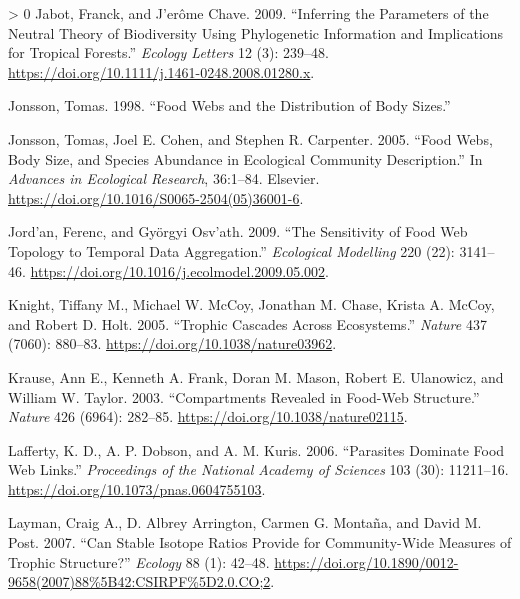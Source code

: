 \documentclass{article}
\newlength{\cslhangindent}
\newenvironment{CSLReferences}[3] %
 {%
  \setlength{\parindent}{0pt}
  \ifodd #1 \everypar{\setlength{\hangindent}{\cslhangindent}}\ignorespaces\fi
  \ifnum #2 > 0
  \setlength{\parskip}{#2\baselineskip}
  \fi
 }%
 {}
\begin{document}
\begin{CSLReferences}{1}{0}
\leavevmode\hypertarget{ref-jabotInferringParametersNeutral2009}{}%
Jabot, Franck, and J'erôme Chave. 2009. {``Inferring the Parameters of
the Neutral Theory of Biodiversity Using Phylogenetic Information and
Implications for Tropical Forests.''} \emph{Ecology Letters} 12 (3):
239--48. \url{https://doi.org/10.1111/j.1461-0248.2008.01280.x}.

\leavevmode\hypertarget{ref-JonssonPhD}{}%
Jonsson, Tomas. 1998. {``Food Webs and the Distribution of Body
Sizes.''}

\leavevmode\hypertarget{ref-jonssonFoodWebsBody2005}{}%
Jonsson, Tomas, Joel E. Cohen, and Stephen R. Carpenter. 2005. {``Food
{Webs}, {Body Size}, and {Species Abundance} in {Ecological Community
Description}.''} In \emph{Advances in {Ecological Research}}, 36:1--84.
{Elsevier}. \url{https://doi.org/10.1016/S0065-2504(05)36001-6}.

\leavevmode\hypertarget{ref-jordanSensitivityFoodWeb2009}{}%
Jord'an, Ferenc, and Györgyi Osv'ath. 2009. {``The Sensitivity of Food
Web Topology to Temporal Data Aggregation.''} \emph{Ecological
Modelling} 220 (22): 3141--46.
\url{https://doi.org/10.1016/j.ecolmodel.2009.05.002}.

\leavevmode\hypertarget{ref-knightTrophicCascadesEcosystems2005}{}%
Knight, Tiffany M., Michael W. McCoy, Jonathan M. Chase, Krista A.
McCoy, and Robert D. Holt. 2005. {``Trophic Cascades Across
Ecosystems.''} \emph{Nature} 437 (7060): 880--83.
\url{https://doi.org/10.1038/nature03962}.

\leavevmode\hypertarget{ref-krauseCompartmentsRevealedFoodweb2003}{}%
Krause, Ann E., Kenneth A. Frank, Doran M. Mason, Robert E. Ulanowicz,
and William W. Taylor. 2003. {``Compartments Revealed in Food-Web
Structure.''} \emph{Nature} 426 (6964): 282--85.
\url{https://doi.org/10.1038/nature02115}.

\leavevmode\hypertarget{ref-laffertyParasitesDominateFood2006}{}%
Lafferty, K. D., A. P. Dobson, and A. M. Kuris. 2006. {``Parasites
Dominate Food Web Links.''} \emph{Proceedings of the National Academy of
Sciences} 103 (30): 11211--16.
\url{https://doi.org/10.1073/pnas.0604755103}.

\leavevmode\hypertarget{ref-laymanCanStableIsotope2007}{}%
Layman, Craig A., D. Albrey Arrington, Carmen G. Montaña, and David M.
Post. 2007. {``Can {Stable Isotope Ratios Provide} for {Community}-{Wide
Measures} of {Trophic Structure}?''} \emph{Ecology} 88 (1): 42--48.
\url{https://doi.org/10.1890/0012-9658(2007)88\%5B42:CSIRPF\%5D2.0.CO;2}.


\end{CSLReferences}
\end{document}
